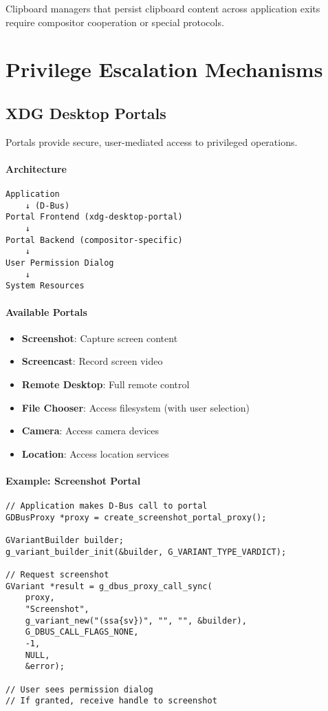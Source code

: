 Clipboard managers that persist clipboard content across application exits require compositor cooperation or special protocols.

\section{Privilege Escalation Mechanisms}

\subsection{XDG Desktop Portals}

Portals provide secure, user-mediated access to privileged operations.

\paragraph{Architecture}

\begin{verbatim}
Application
    ↓ (D-Bus)
Portal Frontend (xdg-desktop-portal)
    ↓
Portal Backend (compositor-specific)
    ↓
User Permission Dialog
    ↓
System Resources
\end{verbatim}

\paragraph{Available Portals}

\begin{itemize}
    \item \textbf{Screenshot}: Capture screen content
    \item \textbf{Screencast}: Record screen video
    \item \textbf{Remote Desktop}: Full remote control
    \item \textbf{File Chooser}: Access filesystem (with user selection)
    \item \textbf{Camera}: Access camera devices
    \item \textbf{Location}: Access location services
\end{itemize}

\paragraph{Example: Screenshot Portal}

\begin{lstlisting}[style=cstyle, caption=Using Screenshot Portal]
// Application makes D-Bus call to portal
GDBusProxy *proxy = create_screenshot_portal_proxy();

GVariantBuilder builder;
g_variant_builder_init(&builder, G_VARIANT_TYPE_VARDICT);

// Request screenshot
GVariant *result = g_dbus_proxy_call_sync(
    proxy,
    "Screenshot",
    g_variant_new("(ssa{sv})", "", "", &builder),
    G_DBUS_CALL_FLAGS_NONE,
    -1,
    NULL,
    &error);

// User sees permission dialog
// If granted, receive handle to screenshot
\end{lstlisting}

